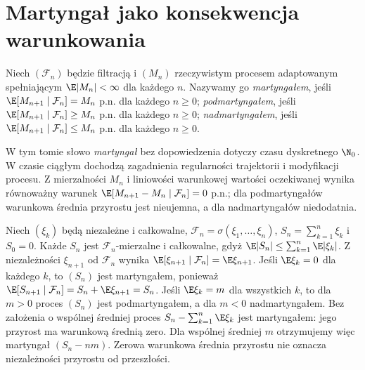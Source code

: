 \section{Martyngał jako konsekwencja warunkowania}

\begin{definicja}
Niech $(\mathcal F_n)$ będzie filtracją i
$(M_n)$ rzeczywistym procesem adaptowanym
spełniającym $\E|M_n|<\infty$ dla każdego $n$.
Nazywamy go \emph{martyngałem}, jeśli
$\E[M_{n+1}\mid\mathcal F_n]=M_n$ p.n.
dla każdego $n\geq0$;
\emph{podmartyngałem}, jeśli
$\E[M_{n+1}\mid\mathcal F_n]\geq M_n$ p.n.
dla każdego $n\geq0$;
\emph{nadmartyngałem}, jeśli
$\E[M_{n+1}\mid\mathcal F_n]\leq M_n$ p.n.
dla każdego $n\geq0$.
\end{definicja}

W tym tomie słowo \emph{martyngał}
bez dopowiedzenia dotyczy czasu dyskretnego
$\N_0$. W czasie ciągłym dochodzą zagadnienia
regularności trajektorii i modyfikacji procesu.
Z mierzalności $M_n$ i liniowości warunkowej
wartości oczekiwanej wynika równoważny warunek
$\E[M_{n+1}-M_n\mid\mathcal F_n]=0$ p.n.;
dla podmartyngałów warunkowa średnia przyrostu
jest nieujemna, a dla nadmartyngałów niedodatnia.

\begin{przyklad}
Niech $(\xi_k)$ będą niezależne i całkowalne,
$\mathcal F_n=\sigma(\xi_1,\ldots,\xi_n)$,
$S_n=\sum_{k=1}^n\xi_k$ i $S_0=0$.
Każde $S_n$ jest $\mathcal F_n$-mierzalne
i całkowalne, gdyż $\E|S_n|\leq\sum_{k=1}^n\E|\xi_k|$.
Z niezależności $\xi_{n+1}$ od $\mathcal F_n$ wynika
$\E[\xi_{n+1}\mid\mathcal F_n]=\E\xi_{n+1}$.
Jeśli $\E\xi_k=0$ dla każdego $k$, to $(S_n)$
jest martyngałem, ponieważ
$\E[S_{n+1}\mid\mathcal F_n]
=S_n+\E\xi_{n+1}=S_n$.
Jeśli $\E\xi_k=m$ dla wszystkich $k$, to
dla $m>0$ proces $(S_n)$ jest podmartyngałem,
a dla $m<0$ nadmartyngałem. Bez założenia
o wspólnej średniej proces
$S_n-\sum_{k=1}^n\E\xi_k$ jest martyngałem:
jego przyrost ma warunkową średnią zero.
Dla wspólnej średniej $m$ otrzymujemy więc
martyngał $(S_n-nm)$. Zerowa warunkowa średnia
przyrostu nie oznacza niezależności przyrostu
od przeszłości.
\end{przyklad}

